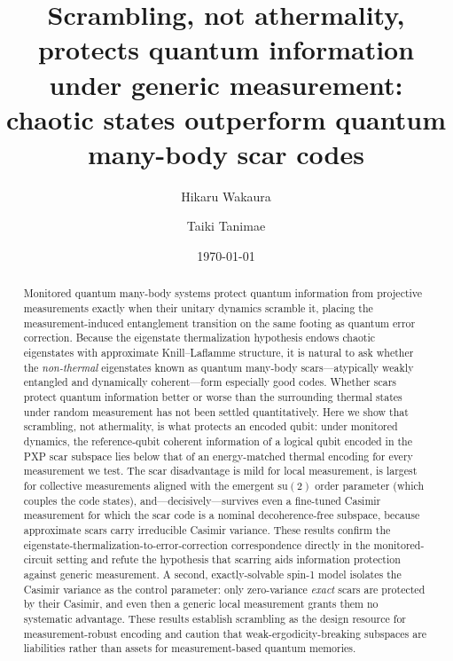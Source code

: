 \documentclass[aps,prxquantum,twocolumn,superscriptaddress,floatfix,longbibliography]{revtex4-2}
\begin{document}
\title{Scrambling, not athermality, protects quantum information under generic
measurement: chaotic states outperform quantum many-body scar codes}

\author{Hikaru Wakaura}
\author{Taiki Tanimae}

\date{\today}   

\begin{abstract}   
Monitored quantum many-body systems protect quantum information from
projective measurements exactly when their unitary dynamics scramble it,
placing the measurement-induced entanglement transition on the same footing as
quantum error correction.
Because the eigenstate thermalization hypothesis endows chaotic eigenstates with
approximate Knill--Laflamme structure, it is natural to ask whether the
\emph{non-thermal} eigenstates known as quantum many-body scars---atypically
weakly entangled and dynamically coherent---form especially good codes.
Whether scars protect quantum information better or worse than the surrounding
thermal states under random measurement has not been settled quantitatively.
Here we show that scrambling, not athermality, is what protects an encoded
qubit: under monitored dynamics, the reference-qubit coherent information of a
logical qubit encoded in the PXP scar subspace lies below that of an
energy-matched thermal encoding for every measurement we test.
The scar disadvantage is mild for local measurement, is largest for collective
measurements aligned with the emergent $\mathrm{su}(2)$ order parameter (which
couples the code states), and---decisively---survives even a fine-tuned Casimir
measurement for which the scar code is a nominal decoherence-free subspace,
because approximate scars carry irreducible Casimir variance.
These results confirm the eigenstate-thermalization-to-error-correction
correspondence directly in the monitored-circuit setting and refute the
hypothesis that scarring aids information protection against generic
measurement. A second, exactly-solvable spin-1 model isolates the Casimir
variance as the control parameter: only zero-variance \emph{exact} scars are
protected by their Casimir, and even then a generic local measurement grants
them no systematic advantage.
These results establish scrambling as the design resource for
measurement-robust encoding and caution that weak-ergodicity-breaking
subspaces are liabilities rather than assets for measurement-based quantum
memories.
\end{abstract}
\end{document}
